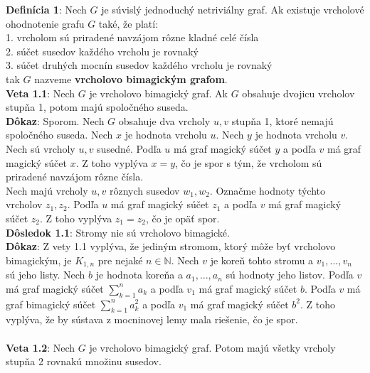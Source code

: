 \documentclass[12pt]{article}
\begin{document}
\textbf{Definícia 1}: Nech $G$ je súvislý jednoduchý netriviálny graf. Ak existuje vrcholové ohodnotenie grafu $G$ také, že platí: \\
1. vrcholom sú priradené navzájom rôzne kladné celé čísla \\
2. súčet susedov každého vrcholu je rovnaký \\
3. súčet druhých mocnín susedov každého vrcholu je rovnaký \\
tak $G$ nazveme \textbf{vrcholovo bimagickým grafom}. \\

\textbf{Veta 1.1}: Nech $G$ je vrcholovo bimagický graf. Ak $G$ obsahuje dvojicu vrcholov stupňa 1, potom majú spoločného suseda. \\

\textbf{Dôkaz}: Sporom. Nech $G$ obsahuje dva vrcholy $u,v$ stupňa 1, ktoré nemajú spoločného suseda. Nech $x$ je hodnota vrcholu $u$. Nech $y$ je hodnota vrcholu $v$. \\

Nech sú vrcholy $u,v$ susedné. Podľa $u$ má graf magický súčet $y$ a podľa $v$ má graf magický súčet $x$. Z toho vyplýva $x = y$, čo je spor s tým, že vrcholom sú priradené navzájom rôzne čísla. \\

Nech majú vrcholy $u,v$ rôznych susedov $w_1, w_2$. Označme hodnoty týchto vrcholov $z_1, z_2$. Podľa $u$ má graf magický súčet $z_1$ a podľa $v$ má graf magický súčet $z_2$. Z toho vyplýva $z_1 = z_2$, čo je opäť spor. \\

\textbf{Dôsledok 1.1}: Stromy nie sú vrcholovo bimagické. \\

\textbf{Dôkaz}: Z vety 1.1 vyplýva, že jediným stromom, ktorý môže byť vrcholovo bimagickým, je $K_{1,n}$ pre nejaké $n \in \mathbb{N}$. Nech $v$ je koreň tohto stromu a $v_1, ... , v_n$ sú jeho listy. Nech $b$ je hodnota koreňa a $a_1, ... , a_n$ sú hodnoty jeho listov. Podľa $v$ má graf magický súčet $\sum_{k=1}^{n} a_k$ a podľa $v_1$ má graf magický súčet $b$. Podľa $v$ má graf bimagický súčet $\sum_{k=1}^{n} a_k^2$ a podľa $v_1$ má graf magický súčet $b^2$. Z toho vyplýva, že by sústava z mocninovej lemy mala riešenie, čo je spor. \\\\

\textbf{Veta 1.2}: Nech $G$ je vrcholovo bimagický graf. Potom majú všetky vrcholy stupňa 2 rovnakú množinu susedov. \\
\end{document}
